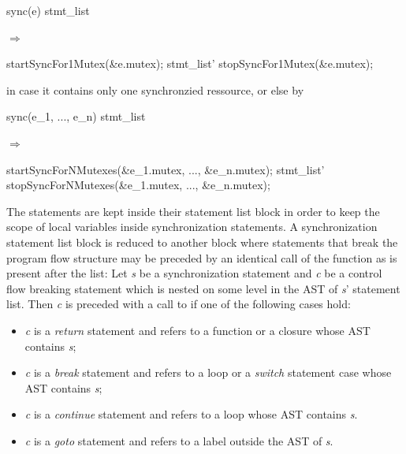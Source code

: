 \begin{center}
\begin{minipage}{0.3\textwidth}
\begin{ccode}
sync(e) stmt_list
\end{ccode}
\end{minipage}
\qquad$\Longrightarrow$\qquad\qquad\qquad
\begin{minipage}{0.4\textwidth}
\begin{ccode}
startSyncFor1Mutex(&e.mutex);
stmt_list'
stopSyncFor1Mutex(&e.mutex);
\end{ccode}
\end{minipage}
\end{center}

in case it contains only one synchronzied ressource, or else by

\begin{center}
\begin{minipage}{0.3\textwidth}
\begin{ccode}
sync(e_1, ..., e_n) stmt_list
\end{ccode}
\end{minipage}
\qquad$\Longrightarrow$\qquad\qquad\qquad
\begin{minipage}{0.4\textwidth}
\begin{ccode}
startSyncForNMutexes(&e_1.mutex, ..., &e_n.mutex);
stmt_list'
stopSyncForNMutexes(&e_1.mutex, ..., &e_n.mutex);
\end{ccode}
\end{minipage}
\end{center}

The statements are kept inside their statement list block in order to keep the scope of local variables inside synchronization statements. A synchronization statement list block is reduced to another block where statements that break the program flow structure may be preceded by an identical call of the  function as is present after the list: Let \textit{s} be a synchronization statement and \textit{c} be a control flow breaking statement which is nested on some level in the AST of \textit{s}' statement list. Then \textit{c} is preceded with a call to  if one of the following cases hold:
\begin{itemize}[label=]
\item \textit{c} is a \textit{return} statement and refers to a function or a closure whose AST contains \textit{s};
\item \textit{c} is a \textit{break} statement and refers to a loop or a \textit{switch} statement case whose AST contains \textit{s};
\item \textit{c} is a \textit{continue} statement and refers to a loop whose AST contains \textit{s}.
\item \textit{c} is a \textit{goto} statement and refers to a label outside the AST of \textit{s}.
\end{itemize}

